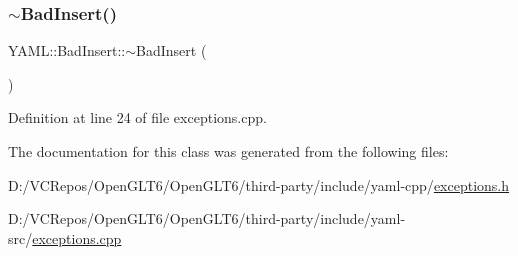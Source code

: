 \subsubsection{\texorpdfstring{$\sim$BadInsert()}{~BadInsert()}}
{\footnotesize\ttfamily Y\+A\+M\+L\+::\+Bad\+Insert\+::$\sim$\+Bad\+Insert (\begin{DoxyParamCaption}{ }\end{DoxyParamCaption})\hspace{0.3cm}{\ttfamily [virtual]}}



Definition at line 24 of file exceptions.\+cpp.



The documentation for this class was generated from the following files\+:\begin{DoxyCompactItemize}
\item 
D\+:/\+V\+C\+Repos/\+Open\+G\+L\+T6/\+Open\+G\+L\+T6/third-\/party/include/yaml-\/cpp/\mbox{\hyperlink{exceptions_8h}{exceptions.\+h}}\item 
D\+:/\+V\+C\+Repos/\+Open\+G\+L\+T6/\+Open\+G\+L\+T6/third-\/party/include/yaml-\/src/\mbox{\hyperlink{exceptions_8cpp}{exceptions.\+cpp}}\end{DoxyCompactItemize}
